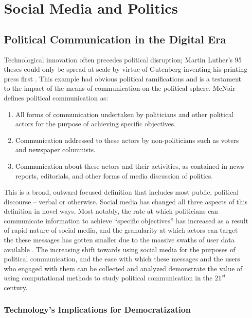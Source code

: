 \chapter{Social Media and Politics}\label{ch:SMandPolitics}

\section{Political Communication in the Digital Era}

Technological innovation often precedes political disruption; Martin Luther’s 95
theses could only be spread at scale by virtue of Gutenberg inventing his
printing press first \cite{gardels2019renovating}. This example had obvious
political ramifications and is a testament to the impact of the means of
communication on the political sphere. McNair defines political communication
as:

\begin{enumerate}    
    \item All forms of communication undertaken by politicians and other
    political actors for the purpose of achieving specific objectives.
    \item Communication addressed to these actors by non-politicians such as
    voters and newspaper columnists.
    \item Communication about these actors and their activities, as contained in news reports, editorials, and other forms of media discussion of politics. \cite{mcnair2017introduction}
\end{enumerate} 

This is a broad, outward focused definition that includes most public, political
discourse -- verbal or otherwise. Social media has changed all three aspects of
this definition in novel ways. Most notably, the rate at which politicians can
communicate information to achieve “specific objectives” has increased as a
result of rapid nature of social media, and the granularity at which actors can
target the these messages has gotten smaller due to the massive swaths of user
data available \cite{nickerson2014political}. The increasing shift towards using
social media for the purposes of political communication, and the ease with
which these messages and the users who engaged with them can be collected and
analyzed demonstrate the value of using computational methods to study political
communication in the $21^{st}$ century.

\subsection{Technology's Implications for Democratization}

